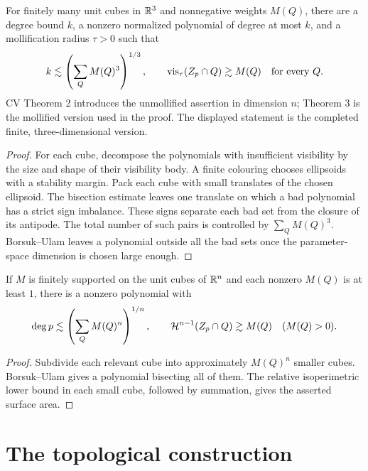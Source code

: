 \begin{theorem}
\label{thm:cv-mollified-visibility}
\leanok
{}
For finitely many unit cubes in $\mathbb{R}^3$ and nonnegative weights $M(Q)$,
there are a degree bound $k$, a nonzero normalized polynomial of
degree at most $k$, and a mollification radius $\tau>0$ such that
\[
       k\lesssim\left(\sum_Q M(Q)^3\right)^{1/3},\qquad
       \operatorname{vis}_\tau(Z_p\cap Q)\gtrsim M(Q)
       \quad\hbox{for every }Q.
\]
CV Theorem 2 introduces the unmollified assertion in dimension $n$;
Theorem 3 is the mollified version used in the proof. The displayed
statement is the completed finite, three-dimensional version.
\end{theorem}
\begin{proof}
\leanok
For each cube, decompose the polynomials with insufficient visibility
by the size and shape of their visibility body. A finite colouring
chooses ellipsoids with a stability margin. Pack each cube with small
translates of the chosen ellipsoid. The bisection estimate leaves
one translate on which a bad polynomial has a strict sign imbalance.
These signs separate each bad set from the closure of its antipode.
The total number of such pairs is controlled by $\sum_Q M(Q)^3$.
Borsuk--Ulam leaves a polynomial outside all the bad sets once the
parameter-space dimension is chosen large enough.
\end{proof}

\begin{proposition}
\label{prop:cv-surface-area}
If $M$ is finitely supported on the unit cubes of $\mathbb{R}^n$ and each
nonzero $M(Q)$ is at least $1$, there is a nonzero polynomial with
\[
 \deg p\lesssim\left(\sum_Q M(Q)^n\right)^{1/n},\qquad
 \mathcal{H}^{n-1}(Z_p\cap Q)\gtrsim M(Q)
 \quad(M(Q)>0).
\]
\end{proposition}
\begin{proof}
Subdivide each relevant cube into approximately $M(Q)^n$ smaller
cubes. Borsuk--Ulam gives a polynomial bisecting all of them.
The relative isoperimetric lower bound in each small cube, followed
by summation, gives the asserted surface area.
\end{proof}

\section{The topological construction}

